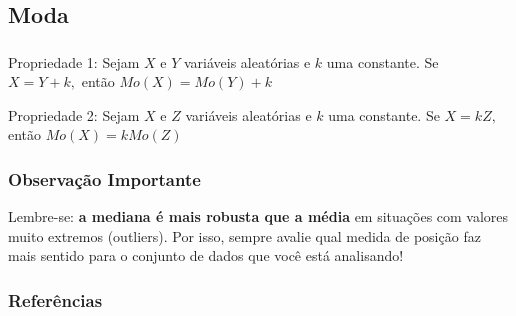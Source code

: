 \documentclass[14pt,aspectratio=1610]{beamer}
\begin{document}
\subsection{Moda}
\begin{frame}{}
	\frametitle{}
	\begin{block}{Propriedade 1:}
		\justifying
		Sejam $X$ e $Y$ variáveis aleatórias e $k$ uma constante. Se $X=Y+k,$ então $Mo(X)=Mo(Y)+k$
	\end{block}
	\pause
	\begin{block}{Propriedade 2:}
		\justifying
		Sejam $X$ e $Z$ variáveis aleatórias e $k$ uma constante. Se $X=kZ,$ então $Mo(X)=kMo(Z)$
		\nocite{Morettin09} \nocite{eric}
	\end{block}
\end{frame}

\begin{frame}{}
	\frametitle{Observação Importante}
	\begin{block}{}
		\justifying
		Lembre-se: \textbf{a mediana é mais robusta que a média} em situações com valores muito extremos (outliers). Por isso, sempre avalie qual medida de posição faz mais sentido para o conjunto de dados que você está analisando!
	\end{block}
\end{frame}





\begin{frame}[allowframebreaks]
\frametitle{\bf Referências}
\printbibliography[heading=none]
\end{frame}
\end{document}
